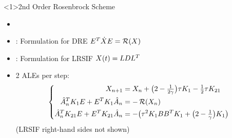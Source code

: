 \begin{frame}<1>{2nd Order Rosenbrock Scheme}
\begin{bigpicturecols}
  \begin{itemize}
    \item
      \cite{Verwer1999}
    \item
      \cite{Mena2007}: Formulation for DRE $E^T \dot X E = \operatorname{\mathcal R}(X)$
    \item
      \cite{Lang2017}: Formulation for LRSIF $X(t) = LDL^T$
    \item
      2 ALEs per step:
      \begin{equation*}
      \left\{
      \begin{aligned}
        X_{n+1} &= X_n + \big( 2 - \tfrac{1}{2\gamma} \big) \tau K_1 - \tfrac{1}{2} \tau K_{21} \\
        \hat A_n^T K_1 E + E^T K_1 \hat A_n &= -\operatorname{\mathcal R}(X_n) \\
        \hat A_n^T K_{21} E + E^T K_{21} \hat A_n &= -\big( \tau^2 K_1 BB^T K_1 + \big( 2-\tfrac{1}{\gamma} \big) K_1 \big)
      \end{aligned}
      \right.
      \end{equation*}
      (LRSIF right-hand sides not shown)
  \end{itemize}
\column{\bigpicturewidth}
\end{bigpicturecols}
\end{frame}
